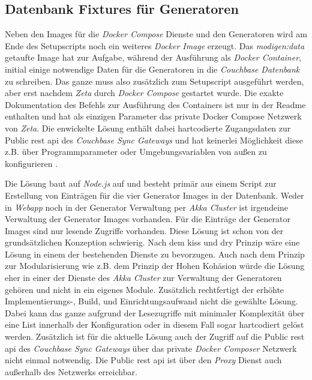 \subsection{Datenbank Fixtures für Generatoren}

Neben den Images für die \textit{Docker Compose} Dienste und den Generatoren wird am Ende des Setupscripts noch ein weiteres \textit{Docker Image} erzeugt. Das \textit{modigen:data} getaufte Image hat zur Aufgabe, während der Ausführung als \textit{Docker Container}, initial einige notwendige Daten für die Generatoren in die \textit{Couchbase Datenbank} zu schreiben. Das ganze muss also zusätzlich zum Setupscript ausgeführt werden, aber erst nachdem \textit{Zeta} durch \textit{Docker Compose} gestartet wurde. Die exakte Dokumentation des Befehls zur Ausführung des Containers ist nur in der Readme enthalten und hat als einzigen Parameter das private Docker Compose Netzwerk von \textit{Zeta}. Die enwickelte Lösung enthält dabei hartcodierte Zugangsdaten zur Public \ac{rest} \ac{api} des \textit{Couchbase Sync Gateways} und hat keinerlei Möglichkeit diese z.B. über Programmparameter oder Umgebungsvariablen von außen zu konfigurieren \cite{zeta_docker_data}. 

Die Lösung baut auf \textit{Node.js} auf und besteht primär aus einem Script zur Erstellung von Einträgen für die vier Generator Images in der Datenbank. Weder in \textit{Webapp} noch in der Generator Verwaltung per \textit{Akka Cluster} ist irgendeine Verwaltung der Generator Images vorhanden. Für die Einträge der Generator Images sind nur lesende Zugriffe vorhanden. Diese Lösung ist schon von der grundsätzlichen Konzeption schwierig. Nach dem \ac{kiss} und \ac{dry} Prinzip wäre eine Lösung in einem der bestehenden Dienste zu bevorzugen. Auch nach dem Prinzip zur Modularisierung wie z.B. dem Prinzip der Hohen Kohäsion würde die Lösung eher in einer der Dienste des \textit{Akka Cluster} zur Verwaltung der Generatoren gehören und nicht in ein eigenes Module. Zusätzlich rechtfertigt der erhöhte Implementierungs-, Build, und Einrichtungsaufwand nicht die gewählte Lösung. Dabei kann das ganze aufgrund der Lesezugriffe mit minimaler Komplexität über eine List innerhalb der Konfiguration oder in diesem Fall sogar hartcodiert gelöst werden. Zusätzlich ist für die aktuelle Lösung auch der Zugriff auf die Public \ac{rest} \ac{api} des \textit{Couchbase Sync Gateways} über das private \textit{Docker Composer} Netzwerk nicht einmal notwendig. Die Public \ac{rest} \ac{api} ist über den \textit{Proxy} Dienst auch außerhalb des Netzwerks erreichbar.

